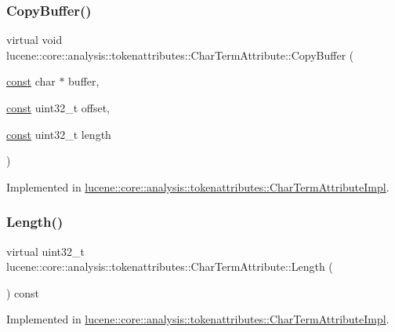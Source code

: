 \subsubsection{\texorpdfstring{Copy\+Buffer()}{CopyBuffer()}}
{\footnotesize\ttfamily virtual void lucene\+::core\+::analysis\+::tokenattributes\+::\+Char\+Term\+Attribute\+::\+Copy\+Buffer (\begin{DoxyParamCaption}\item[{\mbox{\hyperlink{ZlibCrc32_8h_a2c212835823e3c54a8ab6d95c652660e}{const}} char $\ast$}]{buffer,  }\item[{\mbox{\hyperlink{ZlibCrc32_8h_a2c212835823e3c54a8ab6d95c652660e}{const}} uint32\+\_\+t}]{offset,  }\item[{\mbox{\hyperlink{ZlibCrc32_8h_a2c212835823e3c54a8ab6d95c652660e}{const}} uint32\+\_\+t}]{length }\end{DoxyParamCaption})\hspace{0.3cm}{\ttfamily [pure virtual]}}



Implemented in \mbox{\hyperlink{classlucene_1_1core_1_1analysis_1_1tokenattributes_1_1CharTermAttributeImpl_aacb3a44d6999a381dc9217616ba91317}{lucene\+::core\+::analysis\+::tokenattributes\+::\+Char\+Term\+Attribute\+Impl}}.

\mbox{\label{classlucene_1_1core_1_1analysis_1_1tokenattributes_1_1CharTermAttribute_a1e81ad4ff6bc6141f5a6e103cdf7f36d}} 
\subsubsection{\texorpdfstring{Length()}{Length()}}
{\footnotesize\ttfamily virtual uint32\+\_\+t lucene\+::core\+::analysis\+::tokenattributes\+::\+Char\+Term\+Attribute\+::\+Length (\begin{DoxyParamCaption}{ }\end{DoxyParamCaption}) const\hspace{0.3cm}{\ttfamily [pure virtual]}}



Implemented in \mbox{\hyperlink{classlucene_1_1core_1_1analysis_1_1tokenattributes_1_1CharTermAttributeImpl_a20085f30b788448e61de1f5635cd95f0}{lucene\+::core\+::analysis\+::tokenattributes\+::\+Char\+Term\+Attribute\+Impl}}.

